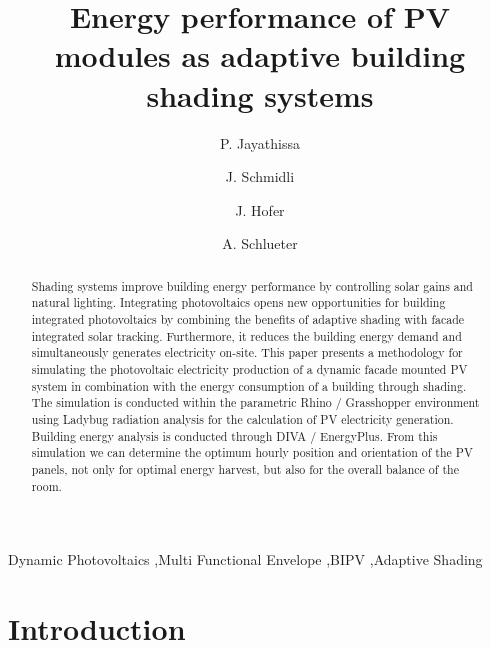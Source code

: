 \documentclass[preprint,11pt,3p]{elsarticle} %
\begin{document}
\begin{frontmatter}

\title{Energy performance of PV modules as adaptive building shading systems} 

\author[ita]{P. Jayathissa}
\address[ita]{Architecture and Building Systems, Institute of Technology in Architecture, Department of Architecture, ETH Zurich, Switzerland} 

\author[ita]{J. Schmidli}

\author[ita]{J. Hofer}


\author[ita]{A. Schlueter  }




\begin{abstract}
Shading systems improve building energy performance by controlling solar gains and natural lighting. Integrating photovoltaics opens new opportunities for building integrated photovoltaics by combining the benefits of adaptive shading with facade integrated solar tracking. Furthermore, it reduces the building energy demand and simultaneously generates electricity on-site. This paper presents a methodology for simulating the photovoltaic electricity production of a dynamic facade mounted PV system in combination with the energy consumption of a building through shading.
The simulation is conducted within the parametric Rhino / Grasshopper environment using Ladybug radiation analysis for the calculation of PV electricity generation. Building energy analysis is conducted through DIVA / EnergyPlus. From this simulation we can determine the optimum hourly position and orientation of the PV panels, not only for optimal energy harvest, but also for the overall balance of the room.

\end{abstract}

\begin{keyword}
Dynamic Photovoltaics \sep Multi Functional Envelope \sep BIPV \sep Adaptive Shading
\end{keyword}

\end{frontmatter}

\section{Introduction}
\label{ch:introduction}

\end{document}
